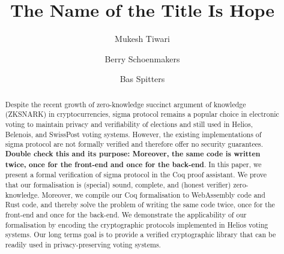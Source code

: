 \documentclass[sigconf]{acmart}
\begin{document}
\title{The Name of the Title Is Hope}


\author{Mukesh Tiwari}

\author{Berry Schoenmakers}


\author{Bas Spitters}

\renewcommand{\shortauthors}{Tiwari et al.}

\begin{abstract}
  Despite the recent growth of zero-knowledge succinct argument 
  of knowledge (ZKSNARK) in cryptocurrencies, 
  sigma protocol remains a popular choice in electronic voting to maintain privacy 
  and verifiability of elections and still used in Helios, Belenois, and SwissPost voting systems. 
  However, the existing implementations of sigma protocol are not formally verified and 
  therefore offer no security guarantees. \textbf{Double check this and its purpose: Moreover, 
  the same code is written twice, once for the front-end and once for the back-end}.
  In this paper, we present a formal verification of sigma protocol in the Coq proof assistant. 
  We prove that our formalisation is (special) sound, complete, and (honest verifier) 
  zero-knowledge. Moreover, 
  we compile our Coq formalisation to WebAssembly code and Rust code, and 
  thereby solve the problem of writing the same code twice, once for the 
  front-end and once for the back-end. We demonstrate the applicability of our
  formalisation by encoding the cryptographic protocols implemented in 
  Helios voting systems. Our long terms goal is to provide a verified
  cryptographic library that can be readily used in 
  privacy-preserving voting systems.


\end{abstract}
\end{document}

